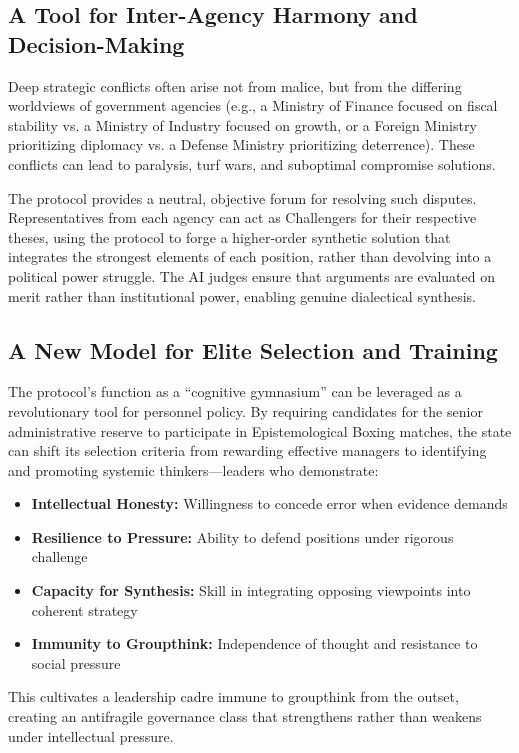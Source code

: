\documentclass[11pt,a4paper]{article}
\begin{document}
\subsection{A Tool for Inter-Agency Harmony and Decision-Making}
Deep strategic conflicts often arise not from malice, but from the differing worldviews of government agencies (e.g., a Ministry of Finance focused on fiscal stability vs. a Ministry of Industry focused on growth, or a Foreign Ministry prioritizing diplomacy vs. a Defense Ministry prioritizing deterrence). These conflicts can lead to paralysis, turf wars, and suboptimal compromise solutions.

The protocol provides a neutral, objective forum for resolving such disputes. Representatives from each agency can act as Challengers for their respective theses, using the protocol to forge a higher-order synthetic solution that integrates the strongest elements of each position, rather than devolving into a political power struggle. The AI judges ensure that arguments are evaluated on merit rather than institutional power, enabling genuine dialectical synthesis.

\subsection{A New Model for Elite Selection and Training}
The protocol's function as a ``cognitive gymnasium'' can be leveraged as a revolutionary tool for personnel policy. By requiring candidates for the senior administrative reserve to participate in Epistemological Boxing matches, the state can shift its selection criteria from rewarding effective managers to identifying and promoting systemic thinkers—leaders who demonstrate:

\begin{itemize}[nosep]
    \item \textbf{Intellectual Honesty:} Willingness to concede error when evidence demands
    \item \textbf{Resilience to Pressure:} Ability to defend positions under rigorous challenge
    \item \textbf{Capacity for Synthesis:} Skill in integrating opposing viewpoints into coherent strategy
    \item \textbf{Immunity to Groupthink:} Independence of thought and resistance to social pressure
\end{itemize}

This cultivates a leadership cadre immune to groupthink from the outset, creating an antifragile governance class that strengthens rather than weakens under intellectual pressure.
\end{document}
